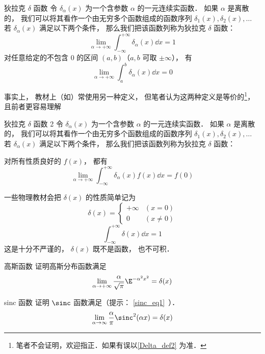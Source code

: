 \begin{definition}{狄拉克 $\delta$ 函数}\label{Delta_def1}
令 $\delta_\alpha(x)$ 为一个含参数 $\alpha$ 的一元连续实函数． 如果 $\alpha$ 是离散的， 我们可以将其看作一个由无穷多个函数组成的函数序列 $\delta_1(x), \delta_2(x), \dots$ 若 $\delta_\alpha(x)$ 满足以下两个条件， 那么我们把该函数列称为狄拉克 $\delta$ 函数：
\begin{equation}\label{Delta_eq5}
\lim_{\alpha\to+\infty}\int_{-\infty}^{+\infty} \delta_\alpha(x) \dd{x} = 1
\end{equation}
对任意给定的不包含 0 的区间 $(a,b)$（$a,b$ 可取 $\pm\infty$）， 有
\begin{equation}\label{Delta_eq4}
\lim_{\alpha\to+\infty} \int_{a}^{b} \delta_\alpha(x) \dd{x} = 0
\end{equation}
\end{definition}
事实上， 教材上（如\cite{Arfken}）常使用另一种定义， 但笔者认为这两种定义是等价的\footnote{笔者不会证明，欢迎指正．如果有误以\autoref{Delta_def2} 为准．}， 且前者更容易理解
\begin{definition}{狄拉克 $\delta$ 函数 2}\label{Delta_def2}
令 $\delta_\alpha(x)$ 为一个含参数 $\alpha$ 的一元连续实函数． 如果 $\alpha$ 是离散的， 我们可以将其看作一个由无穷多个函数组成的函数序列 $\delta_1(x), \delta_2(x), \dots$ 若 $\delta_\alpha(x)$ 满足以下两个条件， 那么我们把该函数列称为狄拉克 $\delta$ 函数：

对所有性质良好的 $f(x)$， 都有
\begin{equation}
\lim_{\alpha\to+\infty}\int_{-\infty}^{+\infty} \delta_\alpha(x)f(x) \dd{x} = f(0)
\end{equation}
\end{definition}

一些物理教材会把 $\delta(x)$ 的性质简单记为
\begin{equation}\label{Delta_eq2}
\delta(x) =
\begin{cases}
+\infty & (x = 0)\\
0 & (x \ne 0)
\end{cases}
\end{equation}
\begin{equation}\label{Delta_eq3}
\int_{-\infty}^{+\infty} \delta(x) \dd{x} = 1
\end{equation}
这是十分不严谨的， $\delta(x)$ 既不是函数， 也不可积．

\begin{exercise}{高斯函数}
证明高斯分布函数满足
\begin{equation}
\lim_{\alpha\to+\infty}\frac{\alpha}{\sqrt{\pi}} \E^{-{\alpha ^2}x^2} = \delta(x)
\end{equation}
\end{exercise}
\begin{exercise}{sinc 函数}\label{Delta_exe1}
证明 $\sinc$ 函数满足（提示： \autoref{sinc_eq1}~）．
\begin{equation}
\lim_{\alpha\to\infty}\frac{\alpha}{\pi}\sinc^2(\alpha x) = \delta(x)
\end{equation}
\end{exercise}

